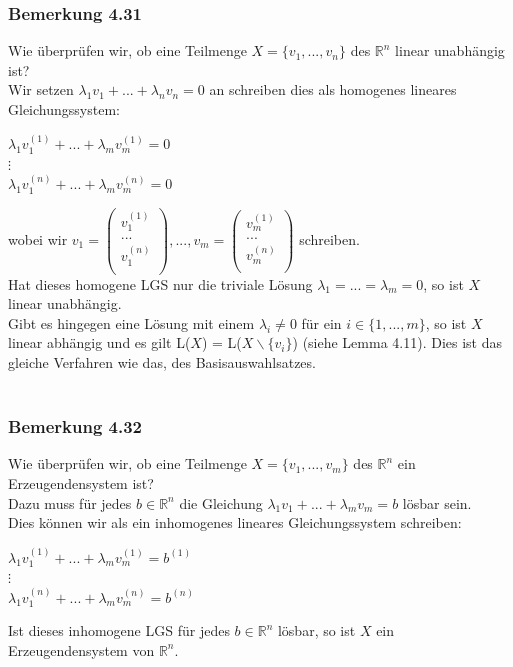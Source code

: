 \documentclass{article}
\begin{document}
\subsubsection*{Bemerkung 4.31}
Wie überprüfen wir, ob eine Teilmenge $X = \{v_1,...,v_n\}$ des $\mathbb{R}^n$ linear unabhängig ist? \\
Wir setzen $\lambda_1 v_1 + ... + \lambda_n v_n = 0$ an schreiben dies als homogenes lineares Gleichungssystem: \\
\begin{center}
    $\lambda_1 v_{1}^{(1)} + ... + \lambda_m v_{m}^{(1)} = 0$ \\
    $\vdots$ \\
    $\lambda_1 v_{1}^{(n)} + ... + \lambda_m v_{m}^{(n)} = 0$ \\
\end{center}
wobei wir $v_1 = \begin{pmatrix}
    v_{1}^{(1)} \\
    ... \\
    v_{1}^{(n)} \\
    \end{pmatrix}, ..., v_m = \begin{pmatrix}
        v_{m}^{(1)} \\
        ... \\
        v_{m}^{(n)} \\
    \end{pmatrix}$ schreiben. \\
Hat dieses homogene LGS nur die triviale Lösung $\lambda_1 = ... = \lambda_m = 0$, so ist $X$ linear unabhängig. \\
Gibt es hingegen eine Lösung mit einem $\lambda_i \neq 0$ für ein $i \in \{1,...,m\}$, so ist $X$ linear abhängig und es gilt L($X$) = L($X \backslash \{v_i\}$) (siehe Lemma 4.11). Dies ist das gleiche Verfahren wie das, des Basisauswahlsatzes. \\
\\
\subsubsection*{Bemerkung 4.32}
Wie überprüfen wir, ob eine Teilmenge $X = \{v_1,...,v_m\}$ des $\mathbb{R}^n$ ein Erzeugendensystem ist? \\
Dazu muss für jedes $b \in \mathbb{R}^n$ die Gleichung $\lambda_1 v_1 + ... + \lambda_m v_m = b$ lösbar sein. \\
Dies können wir als ein inhomogenes lineares Gleichungssystem schreiben: \\
\begin{center}
    $\lambda_1 v_{1}^{(1)} + ... + \lambda_m v_{m}^{(1)} = b^{(1)}$ \\
    $\vdots$ \\
    $\lambda_1 v_{1}^{(n)} + ... + \lambda_m v_{m}^{(n)} = b^{(n)}$ \\
\end{center}
Ist dieses inhomogene LGS für jedes $b \in \mathbb{R}^n$ lösbar, so ist $X$ ein Erzeugendensystem von $\mathbb{R}^n$. \\
\\
\end{document}
